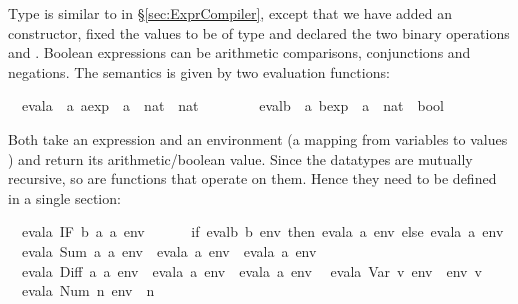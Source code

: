 \begin{isabellebody}
\begin{isamarkuptext}
\noindent
Type  is similar to  in \S\ref{sec:ExprCompiler},
except that we have added an  constructor,
fixed the values to be of type  and declared the two binary
operations  and .  Boolean
expressions can be arithmetic comparisons, conjunctions and negations.
The semantics is given by two evaluation functions:%
\end{isamarkuptext}%
\isamarkuptrue%
\isamarkupfalse%
\ \ evala\ {\isacharcolon}{\isacharcolon}\ {\isachardoublequoteopen}{\isacharprime}a\ aexp\ {\isasymRightarrow}\ {\isacharparenleft}{\isacharprime}a\ {\isasymRightarrow}\ nat{\isacharparenright}\ {\isasymRightarrow}\ nat{\isachardoublequoteclose}\isanewline
\ \ \ \ \ \ \ \ evalb\ {\isacharcolon}{\isacharcolon}\ {\isachardoublequoteopen}{\isacharprime}a\ bexp\ {\isasymRightarrow}\ {\isacharparenleft}{\isacharprime}a\ {\isasymRightarrow}\ nat{\isacharparenright}\ {\isasymRightarrow}\ bool{\isachardoublequoteclose}%
\begin{isamarkuptext}%
\noindent
Both take an expression and an environment (a mapping from variables  to values
) and return its arithmetic/boolean
value. Since the datatypes are mutually recursive, so are functions that
operate on them. Hence they need to be defined in a single 
section:%
\end{isamarkuptext}%
\isamarkuptrue%
\isamarkupfalse%
\isanewline
\ \ {\isachardoublequoteopen}evala\ {\isacharparenleft}IF\ b\ a{}\ a{}{\isacharparenright}\ env\ {\isacharequal}\isanewline
\ \ \ \ \ {\isacharparenleft}if\ evalb\ b\ env\ then\ evala\ a{}\ env\ else\ evala\ a{}\ env{\isacharparenright}{\isachardoublequoteclose}\isanewline
\ \ {\isachardoublequoteopen}evala\ {\isacharparenleft}Sum\ a{}\ a{}{\isacharparenright}\ env\ {\isacharequal}\ evala\ a{}\ env\ {\isacharplus}\ evala\ a{}\ env{\isachardoublequoteclose}\isanewline
\ \ {\isachardoublequoteopen}evala\ {\isacharparenleft}Diff\ a{}\ a{}{\isacharparenright}\ env\ {\isacharequal}\ evala\ a{}\ env\ {\isacharminus}\ evala\ a{}\ env{\isachardoublequoteclose}\isanewline
\ \ {\isachardoublequoteopen}evala\ {\isacharparenleft}Var\ v{\isacharparenright}\ env\ {\isacharequal}\ env\ v{\isachardoublequoteclose}\isanewline
\ \ {\isachardoublequoteopen}evala\ {\isacharparenleft}Num\ n{\isacharparenright}\ env\ {\isacharequal}\ n{\isachardoublequoteclose}\isanewline

\end{isabellebody}
